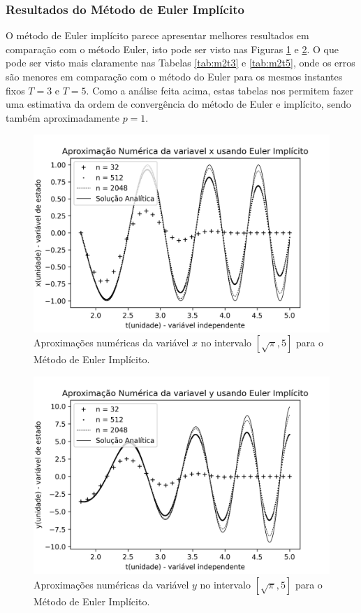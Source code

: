 \documentclass[twocolumn,amsmath,amssymb,floatfix]{revtex4}
\begin{document}
\subsubsection{Resultados do Método de Euler Implícito}

O método de Euler implícito parece apresentar melhores resultados em comparação com o método Euler, isto pode ser visto nas Figuras \ref{fig:m2t3} e \ref{fig:m2t5}.
O que pode ser visto mais claramente nas Tabelas \ref{tab:m2t3} e \ref{tab:m2t5}, onde os erros são menores em comparação com o método do Euler para os mesmos instantes fixos $T=3$ e $T=5$.
Como a análise feita acima, estas tabelas nos permitem fazer uma estimativa da ordem de convergência do método de Euler e implícito, sendo também aproximadamente $p=1$.

\begin{figure}[H]
\centering
\includegraphics[scale=0.55]{images/metodo_2x_T5.0.png}
\caption{Aproximações numéricas da variável $x$ no intervalo $[\sqrt{\pi},5]$ para o Método de Euler Implícito.}
\label{fig:m2t3}
\end{figure}

\begin{figure}[H]
\centering
\includegraphics[scale=0.55]{images/metodo_2y_T5.0.png}
\caption{Aproximações numéricas da variável $y$ no intervalo $[\sqrt{\pi},5]$ para o Método de Euler Implícito.}
\label{fig:m2t5}
\end{figure}
\end{document}
